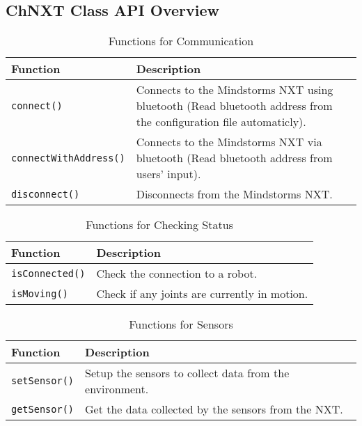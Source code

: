 \subsection{ChNXT Class API Overview}
\begin{longtable}{p{6cm}p{10cm}}
\caption{Functions for Communication}\\
\hline
Function & Description\\
\hline
{\tt connect()}&Connects to the Mindstorms NXT using bluetooth 
(Read bluetooth address from the configuration file automaticly).\\
{\tt connectWithAddress()}&Connects to the Mindstorms NXT via 
bluetooth (Read bluetooth address from users' input).\\
{\tt disconnect()}  &Disconnects from the Mindstorms NXT.\\
\hline
\end{longtable}
\begin{longtable}{ p{6cm}p{10cm}}
\caption{Functions for Checking Status}\\
\hline
Function & Description\\
\hline
{\tt isConnected()}    &Check the connection to a robot.\\
{\tt isMoving()}       &Check if any joints are currently in motion.\\
\hline
\end{longtable}
\begin{longtable}{p{6cm}p{10cm}}
\caption{Functions for Sensors}\\
\hline
Function & Description\\
\hline
{\tt setSensor()}       &Setup the sensors to collect data from the environment.\\
{\tt getSensor()}       &Get the data collected by the sensors from the NXT.\\
\hline
\end{longtable}

